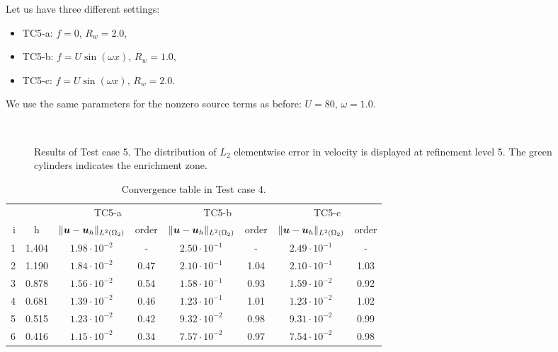 Let us have three different settings: 
\begin{itemize}
    \item TC5-a: $f=0$, $R_w=2.0$,
    \item TC5-b: $f=U\sin(\omega x)$, $R_w=1.0$,
    \item TC5-c: $f=U\sin(\omega x)$, $R_w=2.0$.
\end{itemize}
We use the same parameters for the nonzero source terms as before: $U=80$, $\omega=1.0$.
%
\begin{figure}[!htb]
    \centering
     \\
    \caption
    {Results of Test case 5. The distribution of $L_2$ elementwise error in velocity is displayed at refinement level 5.
    The green cylinders indicates the enrichment zone. }
    \label{fig:mh_tc5_error}
\end{figure}
%
\begin{table}[!htb]
\begin{center}
\bgroup
\def\arraystretch{1.2}
\setlength\tabcolsep{5pt}
\begin{tabular}{rc|cc|cc|cc}
\toprule
\multicolumn{2}{c|}{} & \multicolumn{2}{c|}{ TC5-a } & \multicolumn{2}{c|}{ TC5-b } & \multicolumn{2}{c}{TC5-c}\\ [3pt] %
i & h & $\|\mathbf{\boldsymbol{u}}-\mathbf{\boldsymbol{u}}_h\|_{L^2(\Omega_2)}$ & order & $\|\mathbf{\boldsymbol{u}}-\mathbf{\boldsymbol{u}}_h\|_{L^2(\Omega_2)}$
    & order & $\|\mathbf{\boldsymbol{u}}-\mathbf{\boldsymbol{u}}_h\|_{L^2(\Omega_2)}$ & order \\ [3pt] \midrule
1 & 1.404 &  $1.98\cdot10^{-2}$  &  -   &  $2.50\cdot10^{-1}$  &  -   &  $2.49\cdot10^{-1}$ &   -   \\
2 & 1.190 &  $1.84\cdot10^{-2}$  & 0.47 &  $2.10\cdot10^{-1}$  & 1.04 &  $2.10\cdot10^{-1}$ &  1.03 \\
3 & 0.878 &  $1.56\cdot10^{-2}$  & 0.54 &  $1.58\cdot10^{-1}$  & 0.93 &  $1.59\cdot10^{-2}$ &  0.92 \\
4 & 0.681 &  $1.39\cdot10^{-2}$  & 0.46 &  $1.23\cdot10^{-1}$  & 1.01 &  $1.23\cdot10^{-2}$ &  1.02 \\
5 & 0.515 &  $1.23\cdot10^{-2}$  & 0.42 &  $9.32\cdot10^{-2}$  & 0.98 &  $9.31\cdot10^{-2}$ &  0.99 \\
6 & 0.416 &  $1.15\cdot10^{-2}$  & 0.34 &  $7.57\cdot10^{-2}$  & 0.97 &  $7.54\cdot10^{-2}$ &  0.98 \\
\bottomrule
\end{tabular}
\caption{Convergence table in Test case 4.}
\label{tab:mh_tc5_convergence}
\egroup
\end{center}
\end{table}

